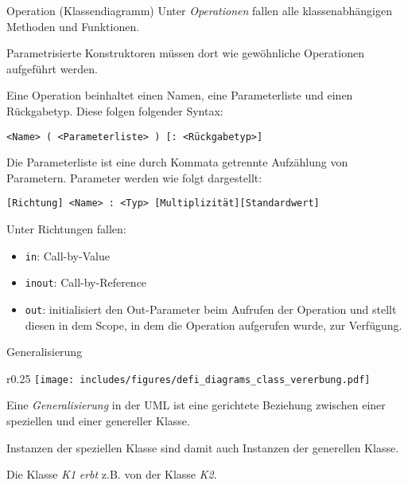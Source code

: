 \begin{diag}{Operation (Klassendiagramm)}
    Unter \emph{Operationen} fallen alle klassenabhängigen Methoden und Funktionen.

    Parametrisierte Konstruktoren müssen dort wie gewöhnliche Operationen aufgeführt werden.

    Eine Operation beinhaltet einen Namen, eine Parameterliste und einen Rückgabetyp.
    Diese folgen folgender Syntax:

    \begin{center}
        \texttt{<Name> ( <Parameterliste> ) [: <Rückgabetyp>]}
    \end{center}

    Die Parameterliste ist eine durch Kommata getrennte Aufzählung von Parametern.
    Parameter werden wie folgt dargestellt:

    \begin{center}
        \texttt{[Richtung] <Name> : <Typ> [Multiplizität][Standardwert]}
    \end{center}

    Unter Richtungen fallen:
    \begin{itemize}
        \item \texttt{in}: Call-by-Value
        \item \texttt{inout}: Call-by-Reference
        \item \texttt{out}: initialisiert den Out-Parameter beim Aufrufen der Operation und stellt diesen in dem Scope, in dem die Operation aufgerufen wurde, zur Verfügung.
    \end{itemize}
\end{diag}

\begin{diag}{Generalisierung}
    \begin{wrapfigure}{r}{0.25\textwidth}
        \centering
        \texttt{[image: includes/figures/defi\_diagrams\_class\_vererbung.pdf]}
    \end{wrapfigure}
    Eine \emph{Generalisierung} in der UML ist eine gerichtete Beziehung zwischen einer speziellen und einer genereller Klasse.

    Instanzen der speziellen Klasse sind damit auch Instanzen der generellen Klasse.

    Die Klasse \emph{K1} \emph{erbt} z.B. von der Klasse \emph{K2}.
\end{diag}

